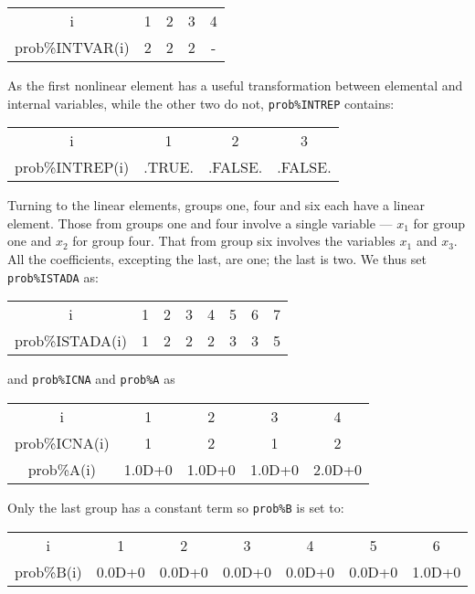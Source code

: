 \documentclass{galahad}
\begin{document}
\begin{center}
{\tt \begin{tabular}{ccccc}
i         & 1 & 2 & 3 & 4\\
prob\%INTVAR(i) & 2 & 2 & 2 & -
\end{tabular} }
\end{center}
As the first nonlinear element has a useful transformation
between elemental and internal variables, while the other two do not,
{\tt prob\%INTREP} contains:

\begin{center}
{\tt \begin{tabular}{cccc}
i         & 1 & 2 & 3 \\
prob\%INTREP(i) & .TRUE. & .FALSE. & .FALSE.
\end{tabular} }
\end{center}

Turning to the linear elements,
groups one, four and six each have
a linear element.
Those from groups one and four
involve a single variable --- $x_1$ for
group one and $x_2$ for group four. That from group six involves
the variables $x_1$ and $x_3$. All the coefficients, excepting the last,
are one; the last is two.
We thus set {\tt prob\%ISTADA} as:

\begin{center}
{\tt \begin{tabular}{cccccccc}
i         & 1 & 2 & 3 & 4 & 5 & 6 & 7\\
prob\%ISTADA(i) & 1 & 2 & 2 & 2 & 3 & 3 & 5
\end{tabular} }
\end{center}
and {\tt prob\%ICNA} and {\tt prob\%A} as

\begin{center}
{\tt \begin{tabular}{ccccc}
i         & 1 & 2 & 3 & 4 \\
prob\%ICNA(i)   & 1 & 2 & 1 & 2 \\
prob\%A(i)      & 1.0D+0 & 1.0D+0 & 1.0D+0 & 2.0D+0
\end{tabular} }
\end{center}
Only the last group
has a constant term so {\tt prob\%B} is set to:

\begin{center}
{\tt \begin{tabular}{ccccccc}
i         & 1 & 2 & 3 & 4 & 5 & 6 \\
prob\%B(i)      & 0.0D+0 & 0.0D+0  & 0.0D+0 & 0.0D+0 & 0.0D+0 & 1.0D+0
\end{tabular} }
\end{center}
\end{document}
